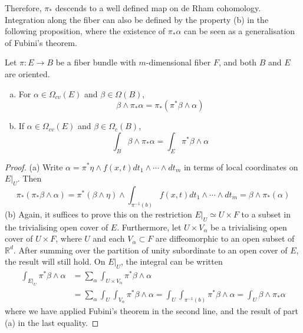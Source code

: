 Therefore, $\pi_*$ descends to a well defined map on de Rham cohomology. 
Integration along the fiber can also be defined by the property (b) in the
following proposition, where the existence of $\pi_*\alpha$ can be seen as a 
generalisation of Fubini's theorem.
\begin{prop} %
	\label{prop:projection_formula}
	Let $\pi : E \to B$ be a fiber bundle with  $m$-dimensional fiber $F$, and
	both $B$ and  $E$ are oriented. 
	\begin{enumerate}[(a), leftmargin=\parindent]
	    \item For $\alpha\in \Omega_{cv}(E)$ and $\beta\in\Omega(B)$, 
	\[
		\beta\wedge \pi_*\alpha = \pi_*(\pi^*\beta\wedge\alpha)  
	\] 
		\item If $\alpha \in \Omega_{cv}(E)$ and $\beta\in \Omega_{c}(B)$,
			\[
			\int_B \beta\wedge \pi_*\alpha =  \int_E \pi^*\beta\wedge\alpha
			\] 
	\end{enumerate}
\end{prop}
\begin{proof}
	(a) Write $\alpha = \pi^*\eta \wedge f(x,t) dt_1\wedge\cdots\wedge dt_m $
	in terms of local coordinates on $E|_U$. Then 
	\[
	\pi_*(\pi_*\beta\wedge \alpha)
	=\pi^*(\beta\wedge\eta)\wedge \int_{\pi^{-1}(b)}f(x,t) 
	dt_1\wedge\cdots\wedge dt_m 	
	= \beta\wedge\pi_*(\alpha)
	\] 
	(b) Again, it suffices to prove this on the restriction $E|_U\simeq U\times F$ to a
	subset in the trivialising open cover of $E$. Furthermore,
	let $U\times V_\alpha$ be a trivialising open cover of $U\times F$, 
	where $U$ and each $V_{\alpha}\subset F$ are diffeomorphic to an open subset of
	$\mathbb{R}^d$. After summing over the partition of unity
	subordinate to an open cover of $E$, 
	the result will still hold. On $E|_U$, the integral can be written
	\begin{align*}
		\int_{E|_U} \pi^*\beta\wedge \alpha
		&= \sum_\alpha\int_{U \times V_\alpha}\pi^*\beta\wedge \alpha \\
		&= \sum_\alpha\int_{U}\int_{V_\alpha}\pi^*\beta\wedge \alpha
		= \int_{U}\int_{\pi^{-1}(b)}\pi^*\beta\wedge \alpha
		= \int_{U}\beta\wedge \pi_*\alpha 
	\end{align*}
	where we have applied Fubini's theorem in the second line, and the result of
	part (a) in the last equality.
\end{proof}


